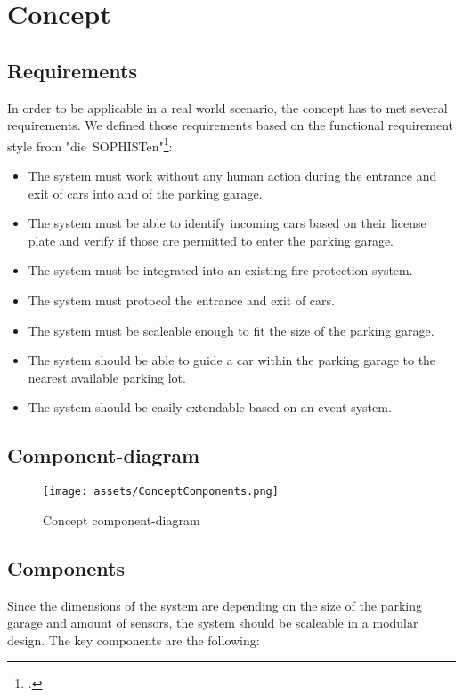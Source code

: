\chapter{Concept}
\section{Requirements}
In order to be applicable in a real world scenario, the concept has to met several requirements. We defined those requirements based on the functional requirement style from "die~SOPHISTen"\footcite[][220]{dbh.79817158820140101}:
\begin{itemize}
    \item The system must work without any human action during the entrance and exit of cars into and of the parking garage. 
    \item The system must be able to identify incoming cars based on their license plate and verify if those are permitted to enter the parking garage.
    \item The system must be integrated into an existing fire protection system.
    \item The system must protocol the entrance and exit of cars.
    \item The system must be scaleable enough to fit the size of the parking garage.
    \item The system should be able to guide a car within the parking garage to the nearest available parking lot.
    \item The system should be easily extendable based on an event system.
\end{itemize}

\section{Component-diagram}
\begin{figure}[H]
    \centering
    \texttt{[image: assets/ConceptComponents.png]}
    \caption{Concept component-diagram}
    \label{fig:Concept component-diagram}
\end{figure}

\section{Components}
\par
Since the dimensions of the system are depending on the size of the parking garage and amount of sensors, the system should be scaleable in a modular design.
The key components are the following:

